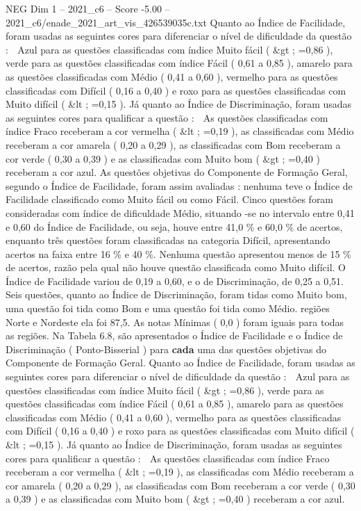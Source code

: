 \begin{textsample}{NEG Dim 1 – 2021\_c6 – Score -5.00 – 2021\_c6/enade\_2021\_art\_vis\_426539035c.txt}
Quanto ao Índice de Facilidade, foram usadas as seguintes cores para diferenciar o nível de dificuldade da questão :  Azul para as questões classificadas com índice Muito fácil ( \&gt ; =0,86 ), verde para as questões classificadas com índice Fácil ( 0,61 a 0,85 ), amarelo para as questões classificadas com Médio ( 0,41 a 0,60 ), vermelho para as questões classificadas com Difícil ( 0,16 a 0,40 ) e roxo para as questões classificadas com Muito difícil ( \&lt ; =0,15 ).
Já quanto ao Índice de Discriminação, foram usadas as seguintes cores para qualificar a questão :  As questões classificadas com índice Fraco receberam a cor vermelha ( \&lt ; =0,19 ), as classificadas com Médio receberam a cor amarela ( 0,20 a 0,29 ), as classificadas com Bom receberam a cor verde ( 0,30 a 0,39 ) e as classificadas com Muito bom ( \&gt ; =0,40 ) receberam a cor azul.
As questões objetivas do Componente de Formação Geral, segundo o Índice de Facilidade, foram assim avaliadas : nenhuma teve o Índice de Facilidade classificado como Muito fácil ou como Fácil.
Cinco questões foram consideradas com índice de dificuldade Médio, situando -se no intervalo entre 0,41 e 0,60 do Índice de Facilidade, ou seja, houve entre 41,0 \% e 60,0 \% de acertos, enquanto três questões foram classificadas na categoria Difícil, apresentando acertos na faixa entre 16 \% e 40 \%.
Nenhuma questão apresentou menos de 15 \% de acertos, razão pela qual não houve questão classificada como Muito difícil.
O Índice de Facilidade variou de 0,19 a 0,60, e o de Discriminação, de 0,25 a 0,51.
Seis questões, quanto ao Índice de Discriminação, foram tidas como Muito bom, uma questão foi tida como Bom e uma questão foi tida como Médio. regiões Norte e Nordeste ela foi 87,5.
As notas Mínimas ( 0,0 ) foram iguais para todas as regiões.
Na Tabela 6.8, são apresentados o Índice de Facilidade e o Índice de Discriminação ( Ponto-Bisserial ) para \textbf{cada} uma das questões objetivas do Componente de Formação Geral.
Quanto ao Índice de Facilidade, foram usadas as seguintes cores para diferenciar o nível de dificuldade da questão :  Azul para as questões classificadas com índice Muito fácil ( \&gt ; =0,86 ), verde para as questões classificadas com índice Fácil ( 0,61 a 0,85 ), amarelo para as questões classificadas com Médio ( 0,41 a 0,60 ), vermelho para as questões classificadas com Difícil ( 0,16 a 0,40 ) e roxo para as questões classificadas com Muito difícil ( \&lt ; =0,15 ).
Já quanto ao Índice de Discriminação, foram usadas as seguintes cores para qualificar a questão :  As questões classificadas com índice Fraco receberam a cor vermelha ( \&lt ; =0,19 ), as classificadas com Médio receberam a cor amarela ( 0,20 a 0,29 ), as classificadas com Bom receberam a cor verde ( 0,30 a 0,39 ) e as classificadas com Muito bom ( \&gt ; =0,40 ) receberam a cor azul.

\end{textsample}
